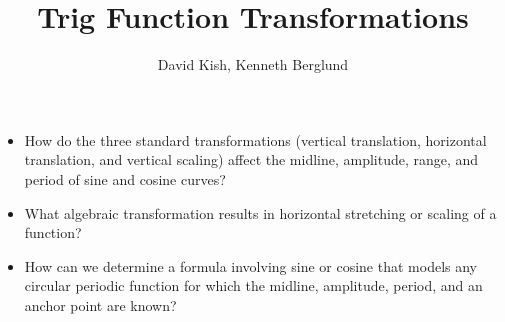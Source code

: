 \documentclass{ximera}
\author{David Kish, Kenneth Berglund}
\title{Trig Function Transformations}
\begin{document}
\begin{abstract}
  
\end{abstract}
\maketitle

%
%
%


%
\begin{motivatingQuestions}
\begin{itemize}[label=\textbullet]
\item{}
How do the three standard transformations (vertical translation, horizontal translation, and vertical scaling) affect the midline, amplitude, range, and period of sine and cosine curves?%
\item{}
What algebraic transformation results in horizontal stretching or scaling of a function?%
\item{}
How can we determine a formula involving sine or cosine that models any circular periodic function for which the midline, amplitude, period, and an anchor point are known?%
\end{itemize}
\end{motivatingQuestions}
\end{document}
